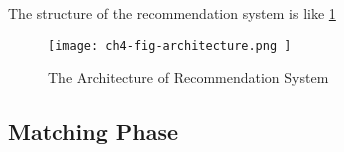 The structure of the recommendation system is like \figurename{\ref{fig:ch4-fig0}}

\begin{figure}[h]
  \centering
  \texttt{[image: ch4-fig-architecture.png ]}
  \caption{The Architecture of Recommendation System}\label{fig:ch4-fig0}
\end{figure}

\subsection{Matching Phase}



